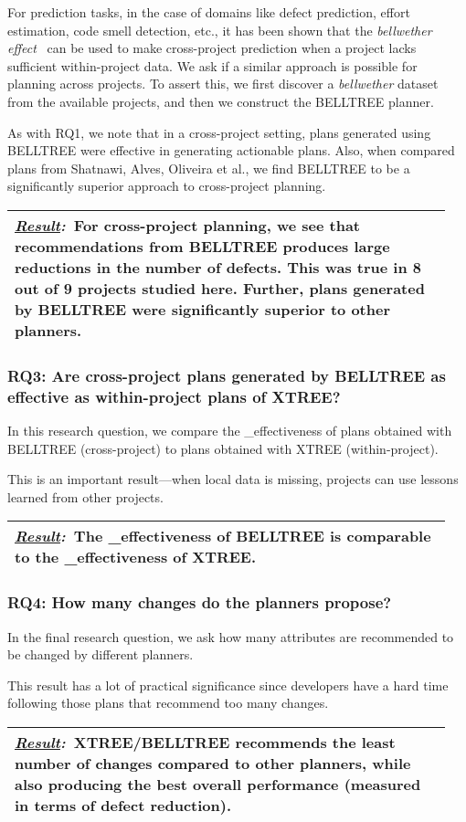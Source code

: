 \documentclass[10pt, journal, compsoc]{IEEEtran}
\newcommand{\result}[1]{
\vspace{0.2cm}
\noindent\begin{minipage}{\linewidth}
\begin{tabular}{|p{0.95\linewidth}|}
\hline\vspace{-0.2cm}
\textbf{\textit{\underline{Result}:}}~#1\\\hline
\end{tabular}
\end{minipage}\bigstrut
}
\begin{document}
For prediction tasks, in the case of domains like defect prediction, effort estimation, code smell detection, etc., it has been shown that the \textit{bellwether effect}~\cite{krishna17a} can be used to make cross-project prediction when a project lacks sufficient within-project data. We ask if a similar approach is possible for planning across projects. To assert this, we first discover a \textit{bellwether} dataset from the available projects, and then we construct the BELLTREE planner. 

As with RQ1, we note that in a cross-project setting, plans generated using BELLTREE were  effective in generating actionable plans. Also, when compared plans from
Shatnawi, Alves, Oliveira et al., we find BELLTREE to be a significantly superior approach to cross-project planning.

\result{For cross-project planning, we see that recommendations from BELLTREE produces large reductions in the number of defects. This was true in 8 out of 9 projects studied here. Further, plans generated by BELLTREE were significantly superior to other planners.}


\subsubsection*{RQ3: Are cross-project plans generated by BELLTREE as effective as within-project plans of XTREE?}

In this research question, we compare the _effectiveness of plans obtained with BELLTREE (cross-project) to plans obtained with XTREE (within-project).

This is an important result---when local data is missing,  projects can use lessons learned from other projects.

\result{The _effectiveness of BELLTREE is comparable to the _effectiveness of XTREE.}

\subsubsection*{RQ4: How many changes do the planners propose?}

In the final research question, we ask how many attributes are recommended to be changed by different planners.

This result has a lot of practical significance since developers have a hard time following those plans that recommend too many changes.


\result{XTREE/BELLTREE recommends the least number of changes compared to other planners,  while also producing the best overall performance (measured in
terms of defect reduction).}
\end{document}
